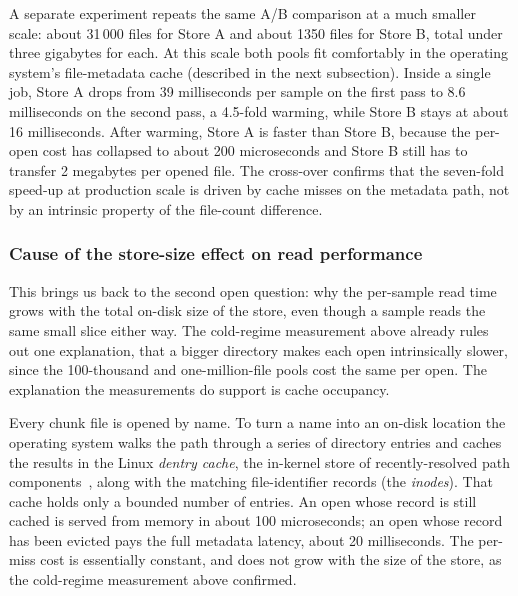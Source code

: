 \documentclass[12pt,a4paper]{article}
\begin{document}
A separate experiment repeats the same A/B comparison at a much smaller scale: about
31\,000 files for Store A and about 1350 files for Store B, total under three gigabytes for
each. At this scale both pools fit comfortably in the operating system's file-metadata
cache (described in the next subsection). Inside a single job, Store A drops from 39
milliseconds per sample on the first pass to 8.6 milliseconds on the second pass, a
4.5-fold warming, while Store B stays at about 16 milliseconds. After warming, Store A is
faster than Store B, because the per-open cost has collapsed to about 200 microseconds and
Store B still has to transfer 2 megabytes per opened file. The cross-over confirms that the
seven-fold speed-up at production scale is driven by cache misses on the metadata path, not
by an intrinsic property of the file-count difference.

\subsubsection{Cause of the store-size effect on read performance}\label{sec:store-size}

This brings us back to the second open question: why the per-sample read time grows with the
total on-disk size of the store, even though a sample reads the same small slice either way.
The cold-regime measurement above already rules out one explanation, that a bigger directory
makes each open intrinsically slower, since the 100-thousand and one-million-file pools cost
the same per open. The explanation the measurements do support is cache occupancy.

Every chunk file is opened by name. To turn a name into an on-disk location the operating
system walks the path through a series of directory entries and caches the results in the
Linux \emph{dentry cache}, the in-kernel store of recently-resolved path
components~\cite{linux_dentry_cache}, along with the matching file-identifier records (the
\emph{inodes}). That cache holds only a bounded number of entries. An open whose record is
still cached is served from memory in about 100 microseconds; an open whose record has been
evicted pays the full metadata latency, about 20 milliseconds. The per-miss cost is
essentially constant, and does not grow with the size of the store, as the cold-regime
measurement above confirmed.
\end{document}
